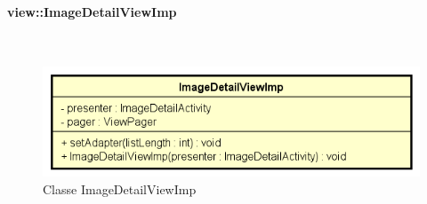 \documentclass[../DefinizioneDiProdotto.tex]{subfiles}
\begin{document}
\paragraph{view::ImageDetailViewImp}
\
\begin{figure}[H]
	\centering
	\includegraphics[width=\maxwidth]{img/ImageDetailViewImp.png}
	\caption{Classe ImageDetailViewImp}\label{fig:view::ImageDetailViewImp} 
\end{figure}
\end{document}
